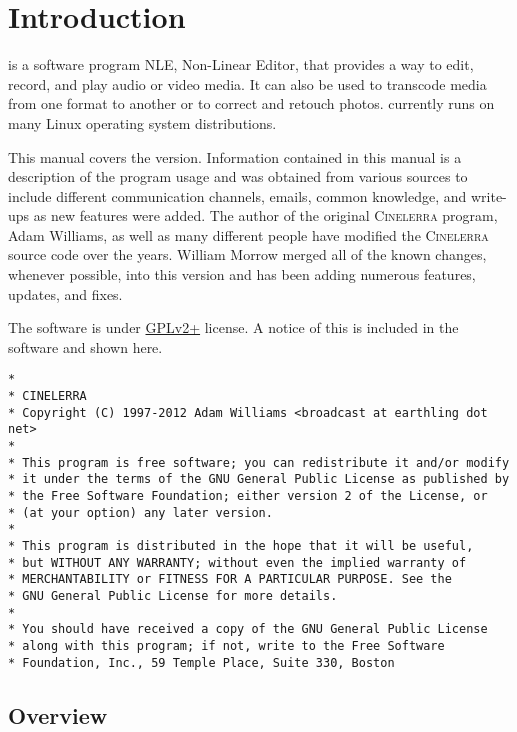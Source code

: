 \chapter*{Introduction}%
\label{cha:introduction}

\CGG{} is a software program NLE, Non-Linear Editor, that provides a
way to edit, record, and play audio or video media.  It can also be
used to transcode media from one format to another or to correct and
retouch photos. \CGG{} currently runs on many Linux operating system
distributions.

This manual covers the \CGG{} \INF{} version.  Information
contained in this manual is a description of the \CGG{} program
usage and was obtained from various sources to include different
communication channels, emails, common knowledge, and write-ups as
new features were added.  The author of the original
\textsc{Cinelerra} program, Adam Williams, as well as many different
people have modified the \textsc{Cinelerra} source code over the
years.  William Morrow merged all of the known changes, whenever
possible, into this \CGG{} version and has been adding numerous
features, updates, and fixes.

The \CGG{} software is under
\href{https://www.gnu.org/licenses/old-licenses/gpl-2.0-standalone.html}{GPLv2+}
license. A notice of this is included in the software and shown here.

\begin{lstlisting}[basicstyle=\footnotesize]
*
* CINELERRA
* Copyright (C) 1997-2012 Adam Williams <broadcast at earthling dot net>
*
* This program is free software; you can redistribute it and/or modify
* it under the terms of the GNU General Public License as published by
* the Free Software Foundation; either version 2 of the License, or
* (at your option) any later version.
*
* This program is distributed in the hope that it will be useful,
* but WITHOUT ANY WARRANTY; without even the implied warranty of
* MERCHANTABILITY or FITNESS FOR A PARTICULAR PURPOSE. See the
* GNU General Public License for more details.
*
* You should have received a copy of the GNU General Public License
* along with this program; if not, write to the Free Software
* Foundation, Inc., 59 Temple Place, Suite 330, Boston
\end{lstlisting}

\section*{\CGG{} Overview}%
\label{sec:cinelerra_overview}


